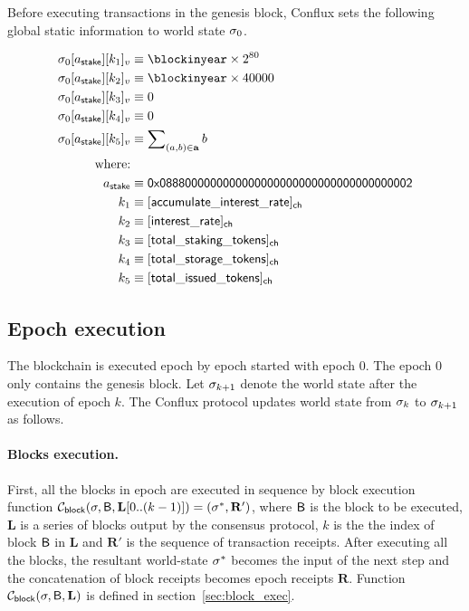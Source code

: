 Before executing transactions in the genesis block, Conflux sets the following global static information to world state $\mathbf{\sigma}_{0}$.

\begin{align}
	\st_{0}[a_{\sf stake}][k_1]_v & \eqdef \blockinyear\times 2^{80} \\ 
	\st_{0}[a_{\sf stake}][k_2]_v & \eqdef \blockinyear\times 40000 \\
	\st_{0}[a_{\sf stake}][k_3]_v & \eqdef 0 \\
	\st_{0}[a_{\sf stake}][k_4]_v & \eqdef 0 \\
	\st_{0}[a_{\sf stake}][k_5]_v & \eqdef \sum\nolimits_{(a,b)\in \vec{a}} b \\
	\mbox{where:}&\\
	a_{\sf stake} &\eqdef \stakingcontract \\
	k_1 &\eqdef \sf [accumulate\char`_interest\char`_rate]_{\sf ch} \\ 
	k_2 &\eqdef \sf [interest\char`_rate]_{\sf ch} \\
    k_3 &\eqdef \sf [total\char`_staking\char`_tokens]_{\sf ch} \\
    k_4 &\eqdef \sf [total\char`_storage\char`_tokens]_{\sf ch} \\
    k_5 &\eqdef \sf [total\char`_issued\char`_tokens]_{\sf ch} 
\end{align}


\subsection{Epoch execution}

The blockchain is executed epoch by epoch started with epoch 0. The epoch 0 only contains the genesis block. Let $\mathbf{\sigma}_{k+1}$ denote the world state after the execution of epoch $k$. The Conflux protocol updates world state from $\mathbf{\sigma}_{k}$ to $\mathbf{\sigma}_{k+1}$ as follows. 

\paragraph{Blocks execution. } First, all the blocks in epoch are executed in sequence by block execution function $\mathcal{C}_{\sf block}(\mathbf{\sigma},\textsf{B},\mathbf{L}[0..(k-1)])=(\mathbf{\sigma}^*,\mathbf{R}')$, where $\textsf{B}$ is the block to be executed,  $\mathbf{L}$ is a series of blocks output by the consensus protocol, $k$ is the the index of block $\textsf{B}$ in $\mathbf{L}$ and $\mathbf{R}'$ is the sequence of transaction receipts. After executing all the blocks, the resultant world-state $\mathbf{\sigma}^*$ becomes the input of the next step and the concatenation of block receipts becomes epoch receipts $\mathbf{R}$. Function $\mathcal{C}_{\sf block}(\mathbf{\sigma},\textsf{B},\mathbf{L})$ is defined in section~\ref{sec:block_exec}.

